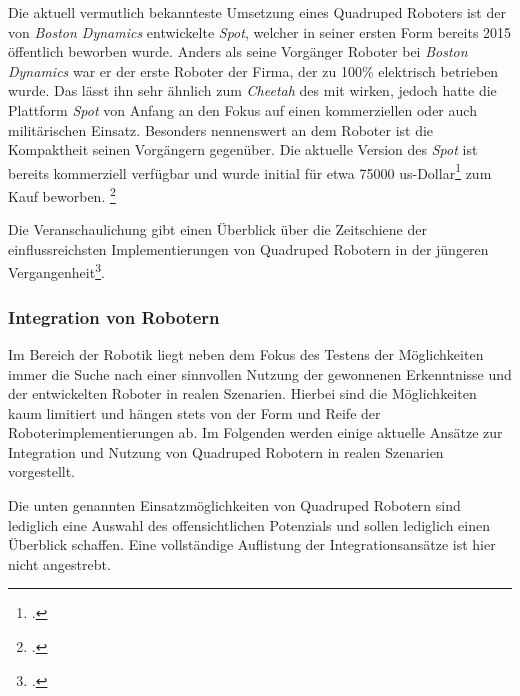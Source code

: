 Die aktuell vermutlich bekannteste Umsetzung eines Quadruped Roboters ist der von \emph{Boston Dynamics} entwickelte
\emph{Spot}, welcher in seiner ersten Form bereits \num{2015} öffentlich beworben wurde.
Anders als seine Vorgänger Roboter bei \emph{Boston Dynamics} war er der erste Roboter der Firma, der zu \num{100}\%
elektrisch betrieben wurde.
Das lässt ihn sehr ähnlich zum \emph{Cheetah} des \gls{mit} wirken, jedoch hatte die Plattform \emph{Spot} von Anfang an den
Fokus auf einen kommerziellen oder auch militärischen Einsatz.
Besonders nennenswert an dem Roboter ist die Kompaktheit seinen Vorgängern gegenüber.
Die aktuelle Version des \emph{Spot} ist bereits kommerziell verfügbar und wurde initial für etwa \num{75000} \gls{us}-Dollar\footcite{spot_price}
zum Kauf beworben.
\footcite{boston_dynamics_legacy}

Die Veranschaulichung  gibt einen Überblick über die Zeitschiene der einflussreichsten
Implementierungen von Quadruped Robotern in der jüngeren Vergangenheit\footcite{quadruped_timeline}.

\subsubsection{Integration von Robotern}

Im Bereich der Robotik liegt neben dem Fokus des Testens der Möglichkeiten immer die Suche nach einer sinnvollen Nutzung
der gewonnenen Erkenntnisse und der entwickelten Roboter in realen Szenarien.
Hierbei sind die Möglichkeiten kaum limitiert und hängen stets von der Form und Reife der Roboterimplementierungen ab.
Im Folgenden werden einige aktuelle Ansätze zur Integration und Nutzung von Quadruped Robotern in realen Szenarien vorgestellt.

Die unten genannten Einsatzmöglichkeiten von Quadruped Robotern sind lediglich eine Auswahl des offensichtlichen
Potenzials und sollen lediglich einen Überblick schaffen.
Eine vollständige Auflistung der Integrationsansätze ist hier nicht angestrebt.

